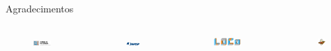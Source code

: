 \documentclass[handout]{beamer}
\begin{document}
\begin{frame}{Agradecimentos}
    \begin{columns}[t]
        \begin{figure}
            \centering
            \includegraphics[width=0.8\textwidth]{images/logo_ic.png}
        \end{figure}
        \vspace{3em}
        \begin{figure}
            \centering
            \includegraphics[width=0.8\textwidth]{images/fapesp.png}
        \end{figure}
        \begin{figure}
            \centering
            \includegraphics[width=0.8\textwidth]{images/logo_loco.png}
        \end{figure}
        \begin{figure}
            \centering
            \includegraphics[width=0.7\textwidth]{images/onpce.png}
        \end{figure}
    \end{columns}
\end{frame}
\end{document}
